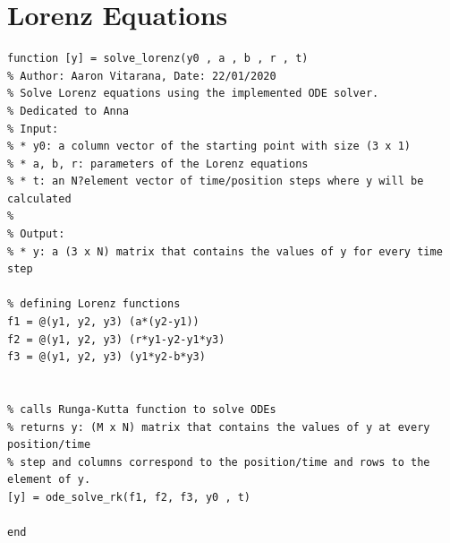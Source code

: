 \documentclass[a4paper,11pt]{article}
\begin{document}
\section{Lorenz Equations}
\begin{lstlisting}
function [y] = solve_lorenz(y0 , a , b , r , t)
% Author: Aaron Vitarana, Date: 22/01/2020
% Solve Lorenz equations using the implemented ODE solver.
% Dedicated to Anna
% Input:
% * y0: a column vector of the starting point with size (3 x 1)
% * a, b, r: parameters of the Lorenz equations
% * t: an N?element vector of time/position steps where y will be calculated
%
% Output:
% * y: a (3 x N) matrix that contains the values of y for every time step
 
% defining Lorenz functions
f1 = @(y1, y2, y3) (a*(y2-y1))
f2 = @(y1, y2, y3) (r*y1-y2-y1*y3)
f3 = @(y1, y2, y3) (y1*y2-b*y3)
 
 
% calls Runga-Kutta function to solve ODEs
% returns y: (M x N) matrix that contains the values of y at every position/time
% step and columns correspond to the position/time and rows to the element of y.
[y] = ode_solve_rk(f1, f2, f3, y0 , t)
 
end

\end{lstlisting}
\end{document}
